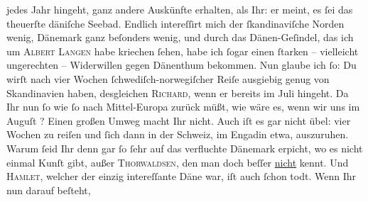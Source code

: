 \begin{ledgroupsized}[t]{13cm}
               jedes Jahr hingeht, ganz andere Auskünfte erhalten, als Ihr: er meint, es ſei das
               theuerſte däniſche Seebad. Endlich  intereſſirt mich der ſkandinaviſche Norden
               wenig, Dänemark ganz beſonders wenig, {\pb}und durch das Dänen-Geſindel, das ich um \textsc{Albert Langen} habe kriechen ſehen, habe ich ſogar einen ſtarken – vielleicht ungerechten –
               Widerwillen gegen Dänenthum
               bekommen. Nun glaube ich  ſo: Du wirſt nach vier Wochen ſchwediſch-norwegiſcher Reiſe ausgiebig genug von Skandinavien haben, desgleichen \textsc{Richard}, wenn er bereits im {\pb}Juli hingeht. Da Ihr nun ſo wie ſo nach Mittel-Europa zurück müßt, wie wäre es, wenn wir uns im Auguſt{ }\label{K_L02778_1v}\label{K_L02778_1h}? Einen großen Umweg macht Ihr nicht. Auch iſt es gar nicht übel: vier Wochen
               zu reiſen und ſich dann in der Schweiz, im Engadin etwa, auszuruhen. Warum ſeid Ihr denn {\pb}gar ſo
               ſehr auf das verfluchte Dänemark erpicht, wo es nicht einmal Kunſt gibt,
               außer \textsc{Thorwaldsen}, den man doch beſſer \uline{nicht} kennt. Und \textsc{Hamlet}, welcher der einzig intereſſante Däne war, iſt auch ſchon todt. Wenn Ihr nun darauf beſteht,

\end{ledgroupsized}
